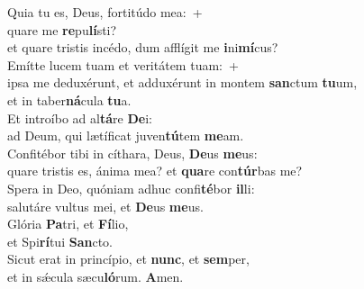 \evenverse Quia tu es, Deus, fortitúdo mea:~+\\\evenverse  quare me \textbf{re}pu\textbf{lí}sti?~\*\\
\evenverse et quare tristis incédo, dum afflígit me \textbf{i}ni\textbf{mí}cus?\\
\oddverse Emítte lucem tuam et veritátem tuam:~+\\
\oddverse  ipsa me deduxérunt, et adduxérunt in montem \textbf{san}ctum \textbf{tu}um,~\*\\
\oddverse et in taber\textbf{ná}cula \textbf{tu}a.\\
\evenverse Et introíbo ad al\textbf{tá}re \textbf{De}i:~\*\\
\evenverse ad Deum, qui lætíficat juven\textbf{tú}tem \textbf{me}am.\\
\oddverse Confitébor tibi in cíthara, Deus, \textbf{De}us \textbf{me}us:~\*\\
\oddverse quare tristis es, ánima mea? et \textbf{qua}re con\textbf{túr}bas me?\\
\evenverse Spera in Deo, quóniam adhuc confi\textbf{té}bor \textbf{il}li:~\*\\
\evenverse salutáre vultus mei, et \textbf{De}us \textbf{me}us.\\
\oddverse Glória \textbf{Pa}tri, et \textbf{Fí}lio,~\*\\
\oddverse et Spi\textbf{rí}tui \textbf{San}cto.\\
\evenverse Sicut erat in princípio, et \textbf{nunc}, et \textbf{sem}per,~\*\\
\evenverse et in sǽcula sæcu\textbf{ló}rum. \textbf{A}men.\\
